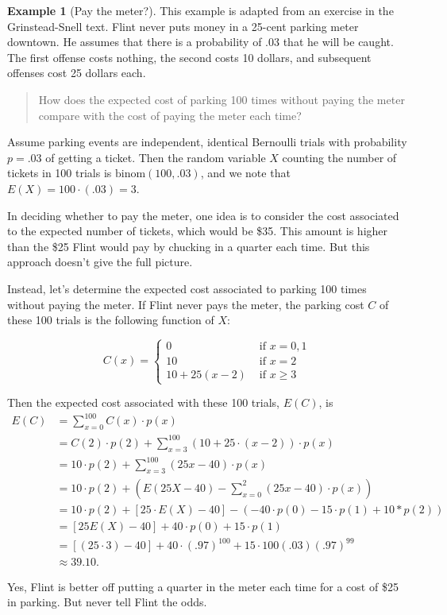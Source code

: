 \documentclass[
]{book}
\theoremstyle{definition}
\theoremstyle{definition}
\newtheorem{example}{Example}[chapter]
\theoremstyle{definition}
\theoremstyle{definition}
\theoremstyle{remark}
\begin{document}
\begin{example}[Pay the meter?]
\protect\hypertarget{exm:parking-meter}{}\label{exm:parking-meter}This example is adapted from an exercise in the Grinstead-Snell text. Flint never puts money in a 25-cent parking meter downtown. He assumes that there is a probability of .03 that he will be caught. The first offense costs nothing, the second costs 10 dollars, and subsequent offenses cost 25 dollars each.

\begin{quote}
How does the expected cost of parking 100 times without paying the meter compare with the cost of paying the meter each time?
\end{quote}

Assume parking events are independent, identical Bernoulli trials with probability \(p = .03\) of getting a ticket. Then the random variable \(X\) counting the number of tickets in 100 trials is \(\text{binom}(100,.03)\), and we note that \(E(X) = 100\cdot(.03) = 3\).

In deciding whether to pay the meter, one idea is to consider the cost associated to the expected number of tickets, which would be \$35. This amount is higher than the \$25 Flint would pay by chucking in a quarter each time. But this approach doesn't give the full picture.

Instead, let's determine the expected cost associated to parking 100 times without paying the meter. If Flint never pays the meter, the parking cost \(C\) of these 100 trials is the following function of \(X\):

\[
C(x)=
\begin{cases}
0 &\text{ if }x = 0,1 \\
10  &\text{ if } x = 2 \\
10+25(x-2) &\text{ if } x \geq 3 
\end{cases}
\]

Then the expected cost associated with these 100 trials, \(E(C)\), is
\begin{align*}
E(C) &= \sum_{x=0}^{100} C(x)\cdot p(x)\\
    &= C(2)\cdot p(2) + \sum_{x=3}^{100} (10 + 25\cdot(x-2))\cdot p(x) \\
    &= 10\cdot p(2) + \sum_{x=3}^{100} (25x - 40)\cdot p(x) \\
    &= 10\cdot p(2)  + \left(E(25X-40) - \sum_{x=0}^{2} (25x - 40)\cdot p(x)\right)\\
    &= 10\cdot p(2) + [25\cdot E(X) - 40] - \left(-40\cdot p(0) -15 \cdot p(1)+ 10*p(2)\right)\\
    &= [25 E(X) - 40] + 40 \cdot p(0) + 15 \cdot p(1) \\
    &= [(25 \cdot 3) - 40] + 40\cdot(.97)^{100} + 15\cdot 100(.03)(.97)^{99} \\
    &\approx 39.10.
\end{align*}

Yes, Flint is better off putting a quarter in the meter each time for a cost of \$25 in parking. But never tell Flint the odds.
\end{example}
\end{document}
